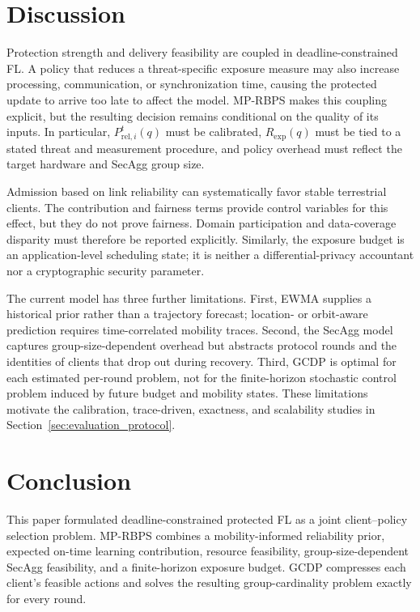 \documentclass[preprint,12pt]{elsarticle}
\begin{document}
\FloatBarrier

\section{Discussion}

Protection strength and delivery feasibility are coupled in deadline-constrained FL. A policy that reduces a threat-specific exposure measure may also increase processing, communication, or synchronization time, causing the protected update to arrive too late to affect the model. MP-RBPS makes this coupling explicit, but the resulting decision remains conditional on the quality of its inputs. In particular, $P_{\mathrm{rel},i}^t(q)$ must be calibrated, $R_{\mathrm{exp}}(q)$ must be tied to a stated threat and measurement procedure, and policy overhead must reflect the target hardware and SecAgg group size.

Admission based on link reliability can systematically favor stable terrestrial clients. The contribution and fairness terms provide control variables for this effect, but they do not prove fairness. Domain participation and data-coverage disparity must therefore be reported explicitly. Similarly, the exposure budget is an application-level scheduling state; it is neither a differential-privacy accountant nor a cryptographic security parameter.

The current model has three further limitations. First, EWMA supplies a historical prior rather than a trajectory forecast; location- or orbit-aware prediction requires time-correlated mobility traces. Second, the SecAgg model captures group-size-dependent overhead but abstracts protocol rounds and the identities of clients that drop out during recovery. Third, GCDP is optimal for each estimated per-round problem, not for the finite-horizon stochastic control problem induced by future budget and mobility states. These limitations motivate the calibration, trace-driven, exactness, and scalability studies in Section~\ref{sec:evaluation_protocol}.

\section{Conclusion}

This paper formulated deadline-constrained protected FL as a joint client--policy selection problem. MP-RBPS combines a mobility-informed reliability prior, expected on-time learning contribution, resource feasibility, group-size-dependent SecAgg feasibility, and a finite-horizon exposure budget. GCDP compresses each client's feasible actions and solves the resulting group-cardinality problem exactly for every round.
\end{document}
